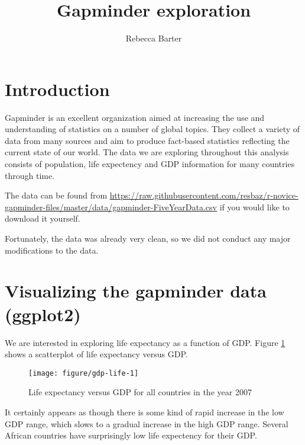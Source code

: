 \documentclass[english]{article}\usepackage[]{graphicx}\usepackage[]{color}
\title{Gapminder exploration}
\author{Rebecca Barter}
\makeatletter
\def\maxwidth{ %
  \ifdim\Gin@nat@width>\linewidth
    \linewidth
  \else
    \Gin@nat@width
  \fi
}
\newenvironment{knitrout}{}{} %
\makeatother
\begin{document}
\maketitle

\section{Introduction}

Gapminder is an excellent organization aimed at increasing the use and understanding of statistics on a number of global topics. They collect a variety of data from many sources and aim to produce fact-based statistics reflecting the current state of our world. The data we are exploring throughout this analysis consists of population, life expectency and GDP information for many countries through time.

The data can be found from \url{https://raw.githubusercontent.com/resbaz/r-novice-gapminder-files/master/data/gapminder-FiveYearData.csv} if you would like to download it yourself.





Fortunately, the data was already very clean, so we did not conduct any major modifications to the data.





\section{Visualizing the gapminder data (ggplot2)}


We are interested in exploring life expectancy as a function of GDP. Figure \ref{fig:gdp-life} shows a scatterplot of life expectancy versus GDP.

\begin{knitrout}
\color{fgcolor}\begin{figure}[H]

{\centering \texttt{[image: figure/gdp-life-1]} 

}

\caption[Life expectancy versus GDP for all countries in the year 2007]{Life expectancy versus GDP for all countries in the year 2007}\label{fig:gdp-life}
\end{figure}


\end{knitrout}


It certainly appears as though there is some kind of rapid increase in the low GDP range, which slows to a gradual increase in the high GDP range. Several African countries have surprisingly low life expectency for their GDP.
\end{document}
